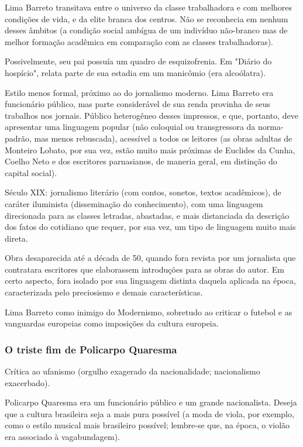 Lima Barreto transitava entre o universo da classe trabalhadora e com melhores condições de vida, e da elite branca dos centros. Não se reconhecia em nenhum desses âmbitos (a condição social ambígua de um indivíduo não-branco mas de melhor formação acadêmica em comparação com as classes trabalhadoras).

Possivelmente, seu pai possuía um quadro de esquizofrenia. Em "Diário do hospício", relata parte de sua estadia em um manicômio (era alcoólatra).

Estilo menos formal, próximo ao do jornalismo moderno. Lima Barreto era funcionário público, mas parte considerável de sua renda provinha de seus trabalhos nos jornais. Público heterogêneo desses impressos, e que, portanto, deve apresentar uma linguagem popular (não coloquial ou transgressora da norma-padrão, mas menos rebuscada), acessível a todos os leitores (as obras adultas de Monteiro Lobato, por sua vez, estão muito mais próximas de Euclides da Cunha, Coelho Neto e dos escritores parnasianos, de maneria geral, em distinção do capital social).

Século XIX: jornalismo literário (com contos, sonetos, textos acadêmicos), de caráter iluminista (disseminação do conhecimento), com uma linguagem direcionada para as classes letradas, abastadas, e mais distanciada da descrição dos fatos do cotidiano que requer, por sua vez, um tipo de linguagem muito mais direta.

Obra desaparecida até a década de 50, quando fora revista por um jornalista que contratara escritores que elaborassem introduções para as obras do autor. Em certo aspecto, fora isolado por sua linguagem distinta daquela aplicada na época, caracterizada pelo preciosismo e demais características.

Lima Barreto como inimigo do Modernismo, sobretudo ao criticar o futebol e as vanguardas europeias como imposições da cultura europeia.

\subsubsection{O triste fim de Policarpo Quaresma}

Crítica ao ufanismo (orgulho exagerado da nacionalidade; nacionalismo exacerbado).

Policarpo Quaresma era um funcionário público e um grande nacionalista. Deseja que a cultura brasileira seja a mais pura possível (a moda de viola, por exemplo, como o estilo musical mais brasileiro possível; lembre-se que, na época, o violão era associado à vagabundagem).

